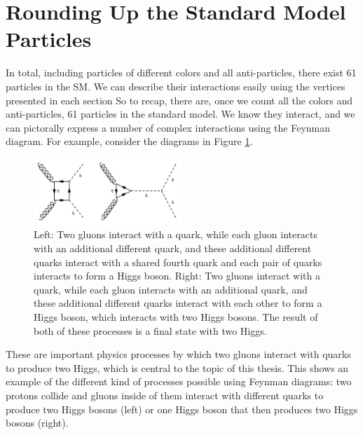 \section{Rounding Up the Standard Model Particles}
In total, including particles of different colors and all anti-particles, there exist 61 particles in the SM. We can describe their interactions easily using the vertices presented in each section
So to recap, there are, once we count all the colors and anti-particles, 61 particles in the standard model. We know they interact, and we can pictorally express a number of complex interactions using the Feynman diagram. For example, consider the diagrams in Figure \ref{Fig:Intro:hh}.
\begin{figure}[h]
    \centering
        \includegraphics[width=0.5\textwidth]{F1/dihiggs}
        \caption{Left: Two gluons interact with a quark, while each gluon interacts with an additional different quark, and these additional different quarks interact with a shared fourth quark and each pair of quarks interacts to form a Higgs boson. Right: Two gluons interact with a quark, while each gluon interacts with an additional quark, and these additional different quarks interact with each other to form a Higgs boson, which interacts with two Higgs bosons. The result of both of these processes is a final state with two Higgs.}
        \label{Fig:Intro:hh}
\end{figure}
These are important physics processes by which two gluons interact with quarks to produce two Higgs, which is central to the topic of this thesis. This shows an example of the different kind of processes possible using Feynman diagrams: two protons collide and gluons inside of them interact with different quarks to produce two Higgs bosons (left) or one Higgs boson that then produces two Higgs bosons (right).


